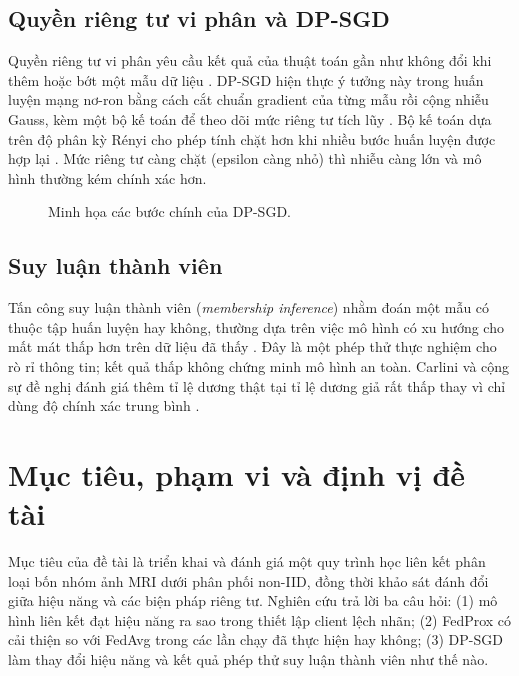 \documentclass[12pt,a4paper]{report}
\begin{document}
\subsection{Quyền riêng tư vi phân và DP-SGD}
Quyền riêng tư vi phân yêu cầu kết quả của thuật toán gần như không đổi khi thêm hoặc bớt một mẫu dữ liệu \citep{dwork}. DP-SGD hiện thực ý tưởng này trong huấn luyện mạng nơ-ron bằng cách cắt chuẩn gradient của từng mẫu rồi cộng nhiễu Gauss, kèm một bộ kế toán để theo dõi mức riêng tư tích lũy \citep{abadi}. Bộ kế toán dựa trên độ phân kỳ Rényi cho phép tính chặt hơn khi nhiều bước huấn luyện được hợp lại \citep{mironov17,mironov19}. Mức riêng tư càng chặt (epsilon càng nhỏ) thì nhiễu càng lớn và mô hình thường kém chính xác hơn.

\begin{figure}[H]\centering
{}
\caption{Minh họa các bước chính của DP-SGD.}\label{fig:dpsgd}
\end{figure}

\subsection{Suy luận thành viên}
Tấn công suy luận thành viên (\textit{membership inference}) nhằm đoán một mẫu có thuộc tập huấn luyện hay không, thường dựa trên việc mô hình có xu hướng cho mất mát thấp hơn trên dữ liệu đã thấy \citep{shokri,yeom}. Đây là một phép thử thực nghiệm cho rò rỉ thông tin; kết quả thấp không chứng minh mô hình an toàn. Carlini và cộng sự đề nghị đánh giá thêm tỉ lệ dương thật tại tỉ lệ dương giả rất thấp thay vì chỉ dùng độ chính xác trung bình \citep{carlini}.

\section{Mục tiêu, phạm vi và định vị đề tài}
Mục tiêu của đề tài là triển khai và đánh giá một quy trình học liên kết phân loại bốn nhóm ảnh MRI dưới phân phối non-IID, đồng thời khảo sát đánh đổi giữa hiệu năng và các biện pháp riêng tư. Nghiên cứu trả lời ba câu hỏi: (1) mô hình liên kết đạt hiệu năng ra sao trong thiết lập client lệch nhãn; (2) FedProx có cải thiện so với FedAvg trong các lần chạy đã thực hiện hay không; (3) DP-SGD làm thay đổi hiệu năng và kết quả phép thử suy luận thành viên như thế nào.
\end{document}

